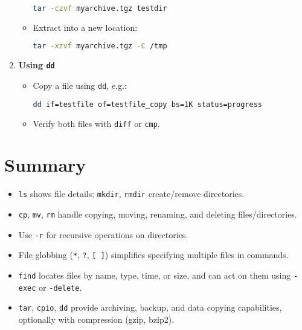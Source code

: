 \documentclass[a4paper]{report}
\begin{document}
\begin{enumerate}
\begin{itemize}
\begin{lstlisting}[language=bash]
tar -czvf myarchive.tgz testdir
\end{lstlisting}
        \item Extract into a new location:
\begin{lstlisting}[language=bash]
tar -xzvf myarchive.tgz -C /tmp
\end{lstlisting}
    \end{itemize}
    \item \textbf{Using \texttt{dd}}
    \begin{itemize}
        \item Copy a file using \texttt{dd}, e.g.:
\begin{lstlisting}[language=bash]
dd if=testfile of=testfile_copy bs=1K status=progress
\end{lstlisting}
        \item Verify both files with \texttt{diff} or \texttt{cmp}.
    \end{itemize}
\end{enumerate}

\section*{Summary}
\begin{itemize}
    \item \texttt{ls} shows file details; \texttt{mkdir}, \texttt{rmdir} create/remove directories.
    \item \texttt{cp}, \texttt{mv}, \texttt{rm} handle copying, moving, renaming, and deleting files/directories.
    \item Use \texttt{-r} for recursive operations on directories.
    \item File globbing (\texttt{*}, \texttt{?}, \texttt{[ ]}) simplifies specifying multiple files in commands.
    \item \texttt{find} locates files by name, type, time, or size, and can act on them using \texttt{-exec} or \texttt{-delete}.
    \item \texttt{tar}, \texttt{cpio}, \texttt{dd} provide archiving, backup, and data copying capabilities, optionally with compression (gzip, bzip2).
\end{itemize}


\newpage
\end{document}
